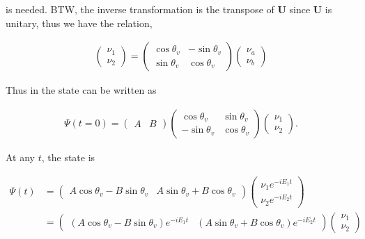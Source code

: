 \documentclass{tufte-handout}
\begin{document}
is needed. BTW, the inverse transformation is the transpose of $\mathbf U$ since $\mathbf U$ is unitary, thus we have the relation,

\begin{align}
\begin{pmatrix}
    \nu_1 \\
    \nu_2
\end{pmatrix} = \begin{pmatrix}
\cos\theta_v & -\sin\theta_v \\
\sin\theta_v & \cos\theta_v
\end{pmatrix} \begin{pmatrix}
    \nu_a \\
    \nu_b
\end{pmatrix}
\end{align}

Thus in the state can be written as

\begin{align}
    \Psi(t=0) = \begin{pmatrix}
        A & B 
    \end{pmatrix} \begin{pmatrix}
        \cos\theta_v & \sin\theta_v \\
        -\sin\theta_v & \cos\theta_v 
    \end{pmatrix}\begin{pmatrix}
        \nu_1 \\
        \nu_2
    \end{pmatrix}.
\end{align}

At any $t$, the state is

\begin{align}
    \Psi(t) &= \begin{pmatrix}
        A \cos\theta_v - B \sin\theta_v & A\sin\theta_v + B \cos\theta_v
    \end{pmatrix} \begin{pmatrix}
        \nu_1 e^{-i E_1 t}\\
        \nu_2 e^{-i E_2 t}
    \end{pmatrix} \\
    & = \begin{pmatrix}
        (A \cos\theta_v - B \sin\theta_v) e^{-iE_1 t} & (A\sin\theta_v + B \cos\theta_v
        ) e^{-iE_2t}\end{pmatrix} \begin{pmatrix}
        \nu_1 \\
        \nu_2
    \end{pmatrix}
\end{align}
\end{document}
